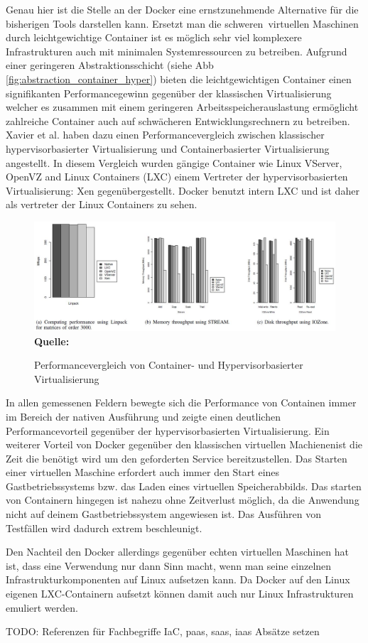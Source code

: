 Genau hier ist die Stelle an der Docker eine ernstzunehmende Alternative für die bisherigen Tools darstellen kann. Ersetzt man die \grq schweren\grq\ virtuellen Maschinen durch leichtgewichtige Container ist es möglich sehr viel komplexere Infrastrukturen auch mit minimalen Systemressourcen zu betreiben.
Aufgrund einer geringeren Abstraktionsschicht (siehe Abb \ref{fig:abstraction_container_hyper}) bieten die leichtgewichtigen Container einen signifikanten Performancegewinn gegenüber der klassischen Virtualisierung welcher es zusammen mit einem geringeren Arbeitsspeicherauslastung ermöglicht zahlreiche Container auch auf schwächeren Entwicklungsrechnern zu betreiben.
Xavier et al. \cite{miguel_g._xavier_performance_????} haben dazu einen Performancevergleich zwischen klassischer hypervisorbasierter Virtualisierung und Containerbasierter Virtualisierung angestellt.
In diesem Vergleich wurden gängige Container  wie Linux VServer, OpenVZ and Linux Containers (LXC) einem Vertreter der hypervisorbasierten Virtualisierung: Xen gegenübergestellt.
Docker benutzt intern LXC und ist daher als vertreter der Linux Containers zu sehen.
\begin{figure}[htbp]
  \centering  
  \includegraphics[scale=0.5]{img/performanceBenchmarks.JPG}\\
  \footnotesize\sffamily\textbf{Quelle:} \cite{miguel_g._xavier_performance_????}
  \caption{Performancevergleich von Container- und Hypervisorbasierter Virtualisierung}
  \label{fig:performance_container_hyper}
\end{figure}
In allen gemessenen Feldern bewegte sich die Performance von Containen immer im Bereich der nativen Ausführung und zeigte einen deutlichen Performancevorteil gegenüber der hypervisorbasierten Virtualisierung. 
Ein weiterer Vorteil von Docker gegenüber den klassischen virtuellen Machienenist die Zeit die benötigt wird um den geforderten Service bereitzustellen. Das Starten einer virtuellen Maschine erfordert auch immer den Start eines Gastbetriebssystems bzw. das Laden eines virtuellen Speicherabbilds. Das starten von Containern hingegen ist nahezu ohne Zeitverlust möglich, da die Anwendung nicht auf deinem Gastbetriebssystem angewiesen ist.
Das Ausführen von Testfällen wird dadurch extrem beschleunigt.


Den Nachteil den Docker allerdings gegenüber echten virtuellen Maschinen hat ist, dass eine Verwendung nur dann Sinn macht, wenn man seine einzelnen Infrastrukturkomponenten auf Linux aufsetzen kann. Da Docker auf den Linux eigenen LXC-Containern aufsetzt können damit auch nur Linux Infrastrukturen emuliert werden.

TODO: Referenzen für Fachbegriffe IaC, paas, saas, iaas
Absätze setzen